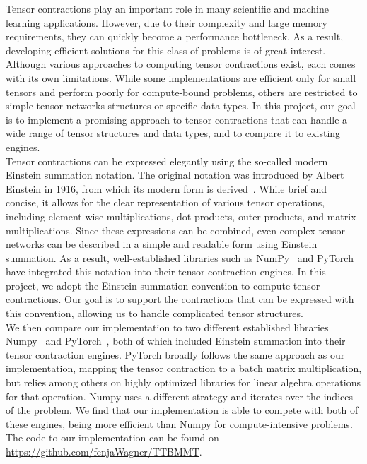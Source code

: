 Tensor contractions play an important role in many scientific and machine learning applications. However, due to their complexity and large memory requirements, they can quickly become a performance bottleneck. 
As a result, developing efficient solutions for this class of problems is of great interest. \\
Although various approaches to computing tensor contractions exist, each comes with its own limitations. While some implementations are efficient only for small tensors and perform poorly for compute-bound problems, others are restricted to simple tensor networks structures or specific data types. In this project, our goal is to implement a promising approach to tensor contractions that can handle a wide range of tensor structures and data types, and to compare it to existing engines.\\

\noindent Tensor contractions can be expressed elegantly using the so-called modern Einstein summation notation. The original notation was introduced by Albert Einstein in 1916, from which its modern form is derived~\cite{einstein}. While brief and concise, it allows for the clear representation of various tensor operations, including element-wise multiplications, dot products, outer products, and matrix multiplications. Since these expressions can be combined, even complex tensor networks can be described in a simple and readable form using Einstein summation. As a result, well-established libraries such as NumPy~\cite{Numpy} and PyTorch~\cite{PyTorch} have integrated this notation into their tensor contraction engines. In this project, we adopt the Einstein summation convention to compute tensor contractions. Our goal is to support the contractions that can be expressed with this convention, allowing us to handle complicated tensor structures.\\

\noindent We then compare our implementation to two different established libraries Numpy~\cite{Numpy} and PyTorch~\cite{PyTorch}, both of which included Einstein summation into their tensor contraction engines. PyTorch broadly follows the same approach as our implementation, mapping the tensor contraction to a batch matrix multiplication, but relies among others on highly optimized libraries for linear algebra operations for that operation. Numpy uses a different strategy and iterates over the indices of the problem. We find that our implementation is able to compete with both of these engines, being more efficient than Numpy for compute-intensive problems.
 The code to our implementation can be found on \url{https://github.com/fenjaWagner/TTBMMT}.\\
 
